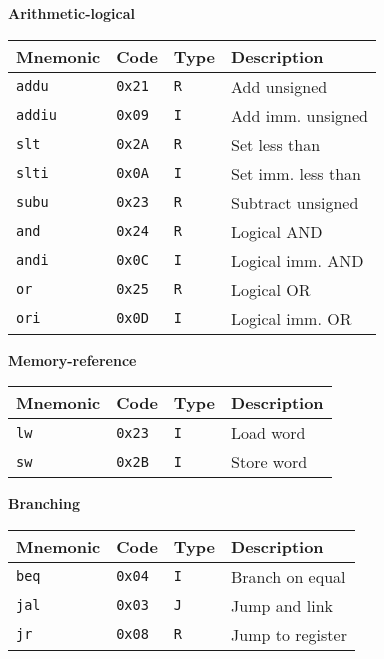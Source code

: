 \documentclass[11pt,twoside,a4paper]{article}
\begin{document}
\begin{figure}[H]
	\begin{multicols}{2}
	\center

	\textbf{Arithmetic-logical} \\
	\vspace{0.15in}
	\begin{tabular}{|l|l|l|l|}
		\hline
		\scriptsize {\bf Mnemonic} &
		\scriptsize {\bf Code} &
		\scriptsize {\bf Type} &
		\scriptsize {\bf Description} \\
		\hline {\tt addu} & {\tt 0x21} & {\tt R} & \scriptsize Add unsigned \\
		\hline {\tt addiu} & {\tt 0x09} & {\tt I} & \scriptsize Add imm. unsigned \\
		\hline {\tt slt} & {\tt 0x2A} & {\tt R} & \scriptsize Set less than \\
		\hline {\tt slti} & {\tt 0x0A} & {\tt I} & \scriptsize Set imm. less than \\
		\hline {\tt subu} & {\tt 0x23} & {\tt R} & \scriptsize Subtract unsigned \\
		\hline {\tt and} & {\tt 0x24} & {\tt R} & \scriptsize Logical AND \\
		\hline {\tt andi} & {\tt 0x0C} & {\tt I} & \scriptsize Logical imm. AND \\
		\hline {\tt or} & {\tt 0x25} & {\tt R} & \scriptsize Logical OR \\
		\hline {\tt ori} & {\tt 0x0D} & {\tt I} & \scriptsize Logical imm. OR \\
		\hline
	\end{tabular}
	
	\columnbreak
	\center

	\textbf{Memory-reference} \\
	\vspace{0.15in}
	\begin{tabular}{|l|l|l|l|}
		\hline
		\scriptsize {\bf Mnemonic} &
		\scriptsize {\bf Code} &
		\scriptsize {\bf Type} &
		\scriptsize {\bf Description} \\
		\hline {\tt lw} & {\tt 0x23} & {\tt I} & \scriptsize Load word \\
		\hline {\tt sw} & {\tt 0x2B} & {\tt I} & \scriptsize Store word \\
		\hline
	\end{tabular}

	\vspace{0.26in} %
	\textbf{Branching} \\
	\vspace{0.15in}
	\begin{tabular}{|l|l|l|l|}
		\hline
		\scriptsize {\bf Mnemonic} &
		\scriptsize {\bf Code} &
		\scriptsize {\bf Type} &
		\scriptsize {\bf Description} \\
		\hline {\tt beq} & {\tt 0x04} & {\tt I} & \scriptsize Branch on equal \\
		\hline {\tt jal} & {\tt 0x03} & {\tt J} & \scriptsize Jump and link \\
		\hline {\tt jr} & {\tt 0x08} & {\tt R} & \scriptsize Jump to register \\
		\hline
	\end{tabular}


\end{multicols}
\end{figure}
\end{document}
